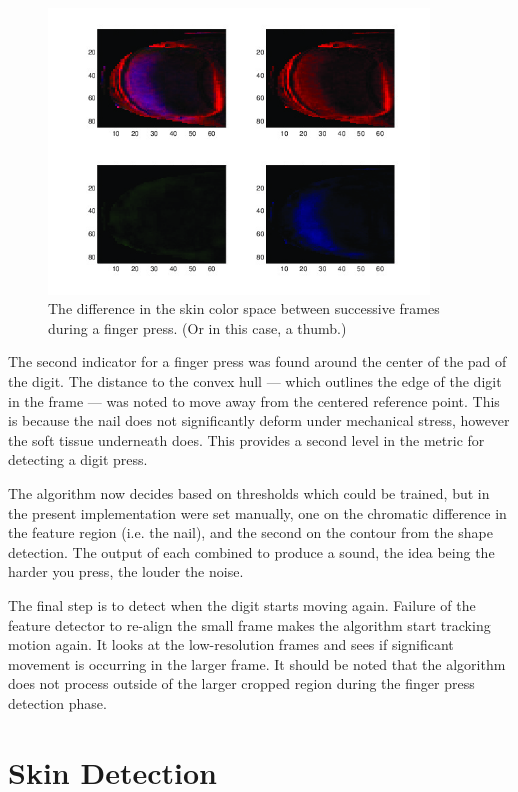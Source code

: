 \begin{figure}[h!]
  \centering
    \includegraphics[width=0.90\textwidth]{Chapter4/Figs/jThumb_Final_Proof.jpg}
    \caption{The difference in the skin color space between successive frames during a finger press. (Or in this case, a thumb.)}\label{fig:FinalProof}
\end{figure}

The second indicator for a finger press was found around the center of the pad of the digit. The distance to the convex hull --- which outlines the edge of the digit in the frame --- was noted to move away from the centered reference point. This is because the nail does not significantly deform under mechanical stress, however the soft tissue underneath does. This provides a second level in the metric for detecting a digit press.

The algorithm now decides based on thresholds which could be trained, but in the present implementation were set manually, one on the chromatic difference in the feature region (i.e. the nail), and the second on the contour from the shape detection. The output of each combined to produce a sound, the idea being the harder you press, the louder the noise.

The final step is to detect when the digit starts moving again. Failure of the feature detector to re-align the small frame makes the algorithm start tracking motion again. It looks at the low-resolution frames and sees if significant movement is occurring in the larger frame. It should be noted that the algorithm does not process outside of the larger cropped region during the finger press detection phase.

\section{Skin Detection}\label{sec:SkinDetection}

